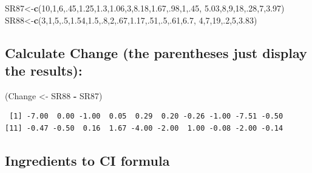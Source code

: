 \documentclass[]{book}
\newenvironment{Shaded}{\begin{snugshade}}{\end{snugshade}}
\newcommand{\DecValTok}[1]{\textcolor[rgb]{0.00,0.00,0.81}{#1}}
\newcommand{\FloatTok}[1]{\textcolor[rgb]{0.00,0.00,0.81}{#1}}
\newcommand{\KeywordTok}[1]{\textcolor[rgb]{0.13,0.29,0.53}{\textbf{#1}}}
\newcommand{\NormalTok}[1]{#1}
\newcommand{\OperatorTok}[1]{\textcolor[rgb]{0.81,0.36,0.00}{\textbf{#1}}}
\newcommand{\StringTok}[1]{\textcolor[rgb]{0.31,0.60,0.02}{#1}}
\theoremstyle{definition}
\theoremstyle{definition}
\theoremstyle{definition}
\theoremstyle{remark}
\begin{document}
\begin{Shaded}
\begin{Highlighting}[]
\NormalTok{SR87<-}\KeywordTok{c}\NormalTok{(}\DecValTok{10}\NormalTok{,}\DecValTok{1}\NormalTok{,}\DecValTok{6}\NormalTok{,.}\DecValTok{45}\NormalTok{,}\FloatTok{1.25}\NormalTok{,}\FloatTok{1.3}\NormalTok{,}\FloatTok{1.06}\NormalTok{,}\DecValTok{3}\NormalTok{,}\FloatTok{8.18}\NormalTok{,}\FloatTok{1.67}\NormalTok{,.}\DecValTok{98}\NormalTok{,}\DecValTok{1}\NormalTok{,.}\DecValTok{45}\NormalTok{,}
                                      \FloatTok{5.03}\NormalTok{,}\DecValTok{8}\NormalTok{,}\DecValTok{9}\NormalTok{,}\DecValTok{18}\NormalTok{,.}\DecValTok{28}\NormalTok{,}\DecValTok{7}\NormalTok{,}\FloatTok{3.97}\NormalTok{)}
\NormalTok{SR88<-}\KeywordTok{c}\NormalTok{(}\DecValTok{3}\NormalTok{,}\DecValTok{1}\NormalTok{,}\DecValTok{5}\NormalTok{,.}\DecValTok{5}\NormalTok{,}\FloatTok{1.54}\NormalTok{,}\FloatTok{1.5}\NormalTok{,.}\DecValTok{8}\NormalTok{,}\DecValTok{2}\NormalTok{,.}\DecValTok{67}\NormalTok{,}\FloatTok{1.17}\NormalTok{,.}\DecValTok{51}\NormalTok{,.}\DecValTok{5}\NormalTok{,.}\DecValTok{61}\NormalTok{,}\FloatTok{6.7}\NormalTok{,}
                                            \DecValTok{4}\NormalTok{,}\DecValTok{7}\NormalTok{,}\DecValTok{19}\NormalTok{,.}\DecValTok{2}\NormalTok{,}\DecValTok{5}\NormalTok{,}\FloatTok{3.83}\NormalTok{)}
\end{Highlighting}
\end{Shaded}

\hypertarget{calculate-change-the-parentheses-just-display-the-results}{%
\subsection{Calculate Change (the parentheses just display the
results):}\label{calculate-change-the-parentheses-just-display-the-results}}

\begin{Shaded}
\begin{Highlighting}[]
\NormalTok{(Change <-}\StringTok{ }\NormalTok{SR88 }\OperatorTok{-}\StringTok{ }\NormalTok{SR87)}
\end{Highlighting}
\end{Shaded}

\begin{verbatim}
 [1] -7.00  0.00 -1.00  0.05  0.29  0.20 -0.26 -1.00 -7.51 -0.50
[11] -0.47 -0.50  0.16  1.67 -4.00 -2.00  1.00 -0.08 -2.00 -0.14
\end{verbatim}

\hypertarget{ingredients-to-ci-formula}{%
\subsection{Ingredients to CI formula}\label{ingredients-to-ci-formula}}
\end{document}
